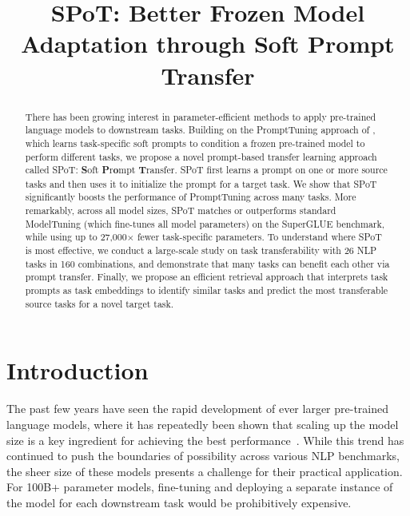 \title{SPoT: Better Frozen Model Adaptation through Soft Prompt Transfer}

\begin{abstract}
\label{section:abstract}

There has been growing interest in parameter-efficient methods to apply pre-trained language models to downstream tasks. Building on the {\small \sc PromptTuning} approach of \citet{BLester21}, which learns task-specific soft prompts to condition a frozen pre-trained model to perform different tasks, we propose a novel prompt-based transfer learning approach called {{\small \sc SPoT}}: \textbf{S}oft \textbf{P}r\textbf{o}mpt \textbf{T}ransfer. 
{{\small \sc SPoT}} first learns a prompt on one or more source tasks and then uses it to initialize the prompt for a target task. We show that {{\small \sc SPoT}} significantly boosts the performance of {\small \sc PromptTuning} across many tasks. More remarkably, across all model sizes,
{{\small \sc SPoT}} matches or outperforms standard {\small \sc ModelTuning} (which fine-tunes all model parameters) on the {\small \sc SuperGLUE} benchmark, while using up to 27,000$\times$ fewer task-specific parameters. To understand where {{\small \sc SPoT}} is most effective, we conduct a large-scale study on task transferability with 26 {\small \sc NLP} tasks in 160 combinations, and demonstrate that many tasks can benefit each other via prompt transfer. Finally, we propose an efficient retrieval approach that interprets task prompts as task embeddings to identify similar tasks and predict the most transferable source tasks for a novel target task.
\end{abstract}

\section{Introduction}
\label{section:introduction}
The past few years have seen the rapid development of ever larger pre-trained language models, where it has repeatedly been shown that scaling up the model size is a key ingredient for achieving the best performance~\cite{JDevlin19,CRaffel20,TBrown20}. While this trend has continued to push the boundaries of possibility across various {\small \sc NLP} benchmarks, the sheer size of these models presents a challenge for their practical application. For 100B+ parameter models, fine-tuning and deploying a separate instance of the model for each downstream task would be prohibitively expensive.

